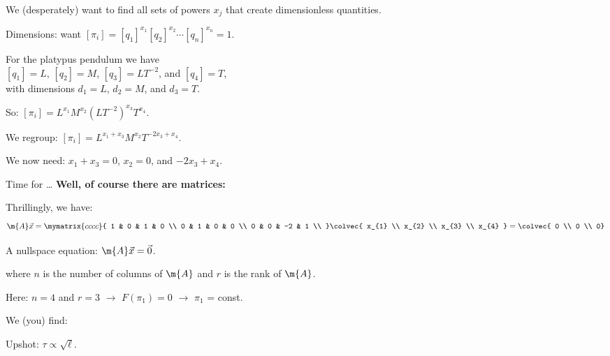 We (desperately) want to find all sets of powers $x_{j}$ that create dimensionless quantities.

Dimensions:
want
$
[\pi_i]
= 
[q_1]^{x_{1}} 
[q_2]^{x_{2}} \cdots
[q_n]^{x_{n}} 
= 
1
$.

For the platypus pendulum we have \\
$[q_1] = L$, $[q_2] = M$, $[q_3] = L T^{-2}$, and $[q_4] = T$,\\

with dimensions
$d_1=L$, $d_2=M$, and $d_3=T$.

So:
$
[\pi_i]
=
L^{x_{1}}
M^{x_{2}}
(LT^{-2})^{x_{3}}
T^{x_{4}}
$.

We regroup:
$
[\pi_i]
=
L^{x_{1} + x_{3}}
M^{x_{2}}
T^{-2x_{3} + x_{4}}
$.

We now need:
$x_{1} + x_{3} = 0$,
$x_{2} =  0$,
and
$-2x_{3} + x_{4}$.

Time for { \ldots}
\textbf{\small Well, of course there are matrices:}

\small

Thrillingly, we have:
$$
\m{A}\vec{x}
=
\mymatrix{cccc}{
  1 & 0 & 1 & 0 \\
  0 & 1 &  0 & 0 \\
  0 & 0 & -2 & 1 \\
}
\colvec{ x_{1} \\ x_{2} \\ x_{3} \\ x_{4} }
= 
\colvec{ 0 \\ 0 \\ 0}
$$

A nullspace equation: $ \m{A} \vec{x} = \vec{0}$.

where $n$ is the number of columns of $\m{A}$ and $r$ is the rank
of $\m{A}$.

Here: $n=4$ and $r=3$ 
{$\rightarrow$ $F(\pi_1) = 0$}
{$\rightarrow$ $\pi_1$ = const.}


We (you) find:

Upshot: $\tau \propto \sqrt{\ell}$.



